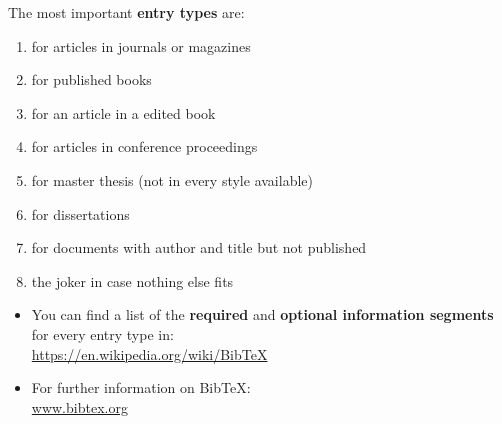 %
%
%
%


\begin{frame}[fragile]


The most important \textbf{entry types} are:

\begin{enumerate}
\item \textbf{} for articles in journals or magazines
\item \textbf{} for published books
\item \textbf{} for an article in a edited book
\item \textbf{} for articles in conference proceedings
\item \textbf{} for master thesis (not in every style available)
\item \textbf{} for dissertations
\item \textbf{} for documents with author and title but not published
\item \textbf{} the joker in case nothing else fits
\end{enumerate}

\pause 

\begin{itemize}

\item You can find a list of the \textbf{required} and \textbf{optional information segments} for every entry type in:\\
\url{https://en.wikipedia.org/wiki/BibTeX}

%

\item For further information on Bib\TeX :\\
\url{www.bibtex.org}
\end{itemize}

\end{frame}


